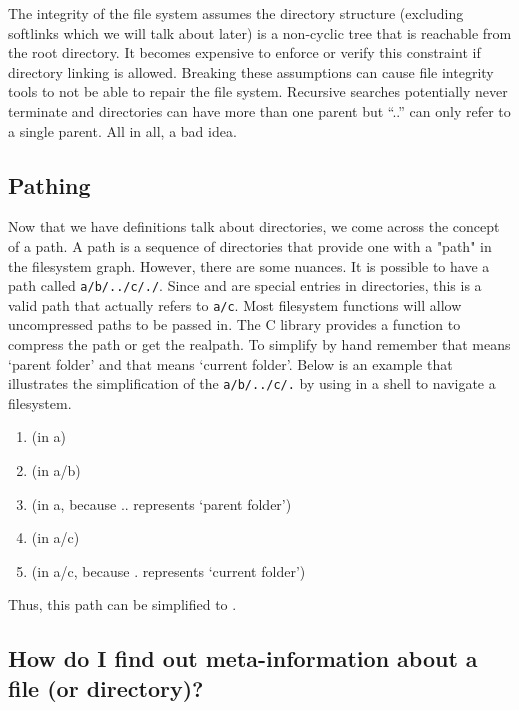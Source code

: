 The integrity of the file system assumes the directory structure (excluding softlinks which we will talk about later) is a non-cyclic tree that is reachable from the root directory. It becomes expensive to enforce or verify this constraint if directory linking is allowed. Breaking these assumptions can cause file integrity tools to not be able to repair the file system. Recursive searches potentially never terminate and directories can have more than one parent but ``..'' can only refer to a single parent. All in all, a bad idea.

\subsection{Pathing}

Now that we have definitions talk about directories, we come across the concept of a path. A path is a sequence of directories that provide one with a "path" in the filesystem graph. However, there are some nuances. It is possible to have a path called \texttt{a/b/../c/./}. Since  and  are special entries in directories, this is a valid path that actually refers to \texttt{a/c}. Most filesystem functions will allow uncompressed paths to be passed in. The C library provides a function  to compress the path or get the realpath. To simplify by hand remember that  means `parent folder' and that  means `current folder'. Below is an example that illustrates the simplification of the \texttt{a/b/../c/.} by using  in a shell to navigate a filesystem.

\begin{enumerate}
  \item {} (in a)
  \item {} (in a/b)
  \item {} (in a, because .. represents `parent folder')
  \item {} (in a/c)
  \item {} (in a/c, because . represents `current folder')
\end{enumerate}

Thus, this path can be simplified to .

\subsection{How do I find out meta-information about a file (or directory)?}\label{how-do-i-find-out-meta-information-about-a-file-or-directory}

